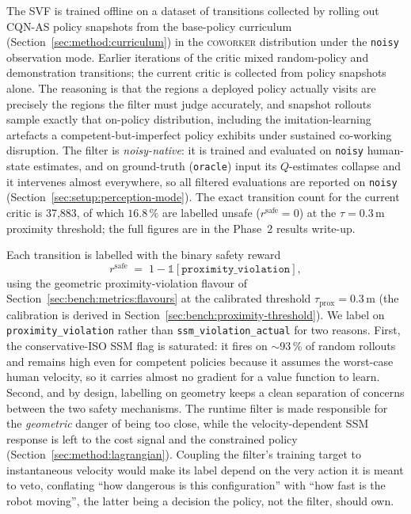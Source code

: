 \documentclass[11pt,a4paper]{report}
\newcommand{\ssm}{SSM}
\newcommand{\cqnas}{CQN-AS}
\newcommand{\coworker}{\textsc{coworker}}
\begin{document}
The SVF is trained offline on a dataset of transitions collected by
rolling out \cqnas{} policy snapshots from the base-policy curriculum
(Section~\ref{sec:method:curriculum}) in the \coworker{} distribution
under the \texttt{noisy} observation mode. Earlier iterations of the
critic mixed random-policy and demonstration transitions; the current
critic is collected from policy snapshots alone. The reasoning is that
the regions a deployed policy actually visits are precisely the regions
the filter must judge accurately, and snapshot rollouts sample exactly
that on-policy distribution, including the imitation-learning artefacts
a competent-but-imperfect policy exhibits under sustained co-working
disruption. The filter is \emph{noisy-native}: it is trained and
evaluated on \texttt{noisy} human-state estimates, and on
ground-truth (\texttt{oracle}) input its $Q$-estimates collapse and it
intervenes almost everywhere, so all filtered evaluations are reported
on \texttt{noisy} (Section~\ref{sec:setup:perception-mode}). The exact
transition count for the current critic is 37{,}883, of which
$16.8\,\%$ are labelled unsafe ($r^{\mathrm{safe}} = 0$) at the
$\tau = 0.3$\,m proximity threshold; the full figures are in the
Phase~2 results write-up.

Each transition is labelled with the binary safety reward
\begin{equation}
  r^{\mathrm{safe}} \;=\; 1 - \mathbb{1}[\texttt{proximity\_violation}],
  \label{eq:r-safe}
\end{equation}
using the geometric proximity-violation flavour of
Section~\ref{sec:bench:metrics:flavours} at the calibrated threshold
$\tau_{\mathrm{prox}} = 0.3$\,m (the calibration is derived in
Section~\ref{sec:bench:proximity-threshold}). We label on
\texttt{proximity\_violation} rather than \texttt{ssm\_violation\_actual}
for two reasons. First, the conservative-ISO \ssm{} flag is saturated:
it fires on $\sim$93\,\% of random rollouts and remains high even for
competent policies because it assumes the worst-case human velocity, so
it carries almost no gradient for a value function to learn. Second, and
by design, labelling on geometry keeps a clean separation of concerns
between the two safety mechanisms. The runtime filter is made
responsible for the \emph{geometric} danger of being too close, while
the velocity-dependent \ssm{} response is left to the cost signal and
the constrained policy (Section~\ref{sec:method:lagrangian}). Coupling
the filter's training target to instantaneous velocity would make its
label depend on the very action it is meant to veto, conflating ``how
dangerous is this configuration'' with ``how fast is the robot moving'',
the latter being a decision the policy, not the filter, should own.
\end{document}
